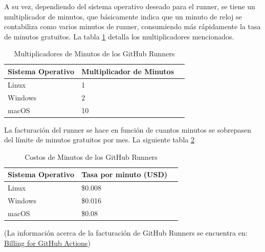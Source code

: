 A su vez, dependiendo del sistema operativo deseado para el runner, se tiene un multiplicador de minutos, que básicamente indica que un minuto de reloj se contabiliza como varios minutos de runner, consumiendo más rápidamente la tasa de minutos gratuitos. La tabla \ref{tab:multiplicadores-minutos} detalla los multiplicadores mencionados.

\begin{table}[H]
\begin{center}
\begin{tabular}{lll}
\hline
\multicolumn{1}{|l|}{\textbf{Sistema Operativo}} & \multicolumn{1}{l|}{\textbf{Multiplicador de Minutos}} \\ \hline
\multicolumn{1}{|l|}{Linux} & \multicolumn{1}{l|}{1} \\ \hline
\multicolumn{1}{|l|}{Windows} & \multicolumn{1}{l|}{2} \\ \hline
\multicolumn{1}{|l|}{macOS} & \multicolumn{1}{l|}{10} \\ \hline
\end{tabular}
\caption{Multiplicadores de Minutos de los GitHub Runners}
\label{tab:multiplicadores-minutos}
\end{center}
\end{table}

La facturación del runner se hace en función de cuantos minutos se sobrepasen del límite de minutos gratuitos por mes. La siguiente tabla \ref{tab:costos-minutos}

\begin{table}[H]
\begin{center}
\begin{tabular}{lll}
\hline
\multicolumn{1}{|l|}{\textbf{Sistema Operativo}} & \multicolumn{1}{l|}{\textbf{Tasa por minuto (USD)}} \\ \hline
\multicolumn{1}{|l|}{Linux} & \multicolumn{1}{l|}{\$0.008} \\ \hline
\multicolumn{1}{|l|}{Windows} & \multicolumn{1}{l|}{\$0.016} \\ \hline
\multicolumn{1}{|l|}{macOS} & \multicolumn{1}{l|}{\$0.08} \\ \hline
\end{tabular}
\caption{Costos de Minutos de los GitHub Runners}
\label{tab:costos-minutos}
\end{center}
\end{table}

(La información acerca de la facturación de GitHub Runners se encuentra en: \href{https://docs.github.com/es/billing/managing-billing-for-github-actions/about-billing-for-github-actions}{Billing for GitHub Actions})

